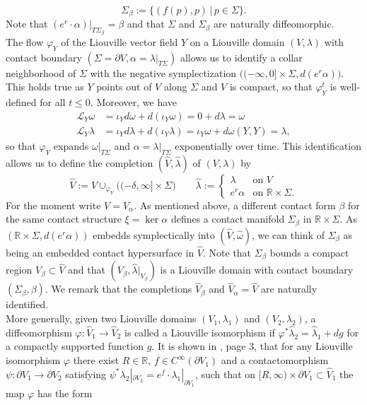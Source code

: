 \documentclass[a4paper,12pt,bibliography=totocnumbered,titlepage=false,abstracton,bookmarksnumbered=true]{scrartcl}
\theoremstyle{definition}
\begin{document}
\[\Sigma_\beta :=\big\{(f(p),p)\,\big|\,p\in\Sigma\big\}.\]
Note that $(e^r{\cdot}\alpha)|_{T\Sigma_\beta}=\beta$ and that $\Sigma$ and $\Sigma_\beta$ are naturally diffeomorphic.\\
The flow $\varphi_Y$ of the Liouville vector field $Y$ on a Liouville domain $(V,\lambda)$ with contact boundary $(\Sigma=\partial V,\alpha=\lambda|_{T\Sigma})$ allows us to identify a collar neighborhood of $\Sigma$ with the negative symplectization $\big((-\infty,0]{\times}\Sigma, d(e^r\alpha)\big)$. This holds true as $Y$ points out of $V$ along $\Sigma$ and $V$ is compact, so that $\varphi_Y^t$ is well-defined for all $t\leq 0$. Moreover, we have
\begin{align*}
 \mathcal{L}_Y \omega &=\iota_Y d\omega + d(\iota_Y\omega)=0+d\lambda=\omega\\
 \mathcal{L}_Y \lambda &=\iota_Y d\lambda + d(\iota_Y\lambda)=\iota_Y\omega+d\omega(Y,Y)=\lambda,
\end{align*}
so that $\varphi_Y$ expands $\omega|_{T\Sigma}$ and $\alpha=\lambda|_{T\Sigma}$ exponentially over time. This identification allows us to define the completion $(\widehat{V},\widehat{\lambda})$ of $(V,\lambda)$ by
\[\widehat{V}:=V\cup_{\varphi_Y}\big((-\delta,\infty]{\times}\Sigma\big)\qquad\widehat{\lambda}:=\begin{cases}\lambda &\text{on $V$}\\e^r\alpha & \text{on $\mathbb{R}{\times}\Sigma$.}\end{cases}\]
For the moment write $V=V_\alpha$. As mentioned above, a different contact form $\beta$ for the same contact structure $\xi=\ker \alpha$ defines a contact manifold $\Sigma_\beta$ in $\mathbb{R}{\times}\Sigma$. As $(\mathbb{R}{\times}\Sigma,d(e^r\alpha))$ embedds symplectically into $(\widehat{V},\widehat{\omega})$, we can think of $\Sigma_\beta$ as being an embedded contact hypersurface in $\widehat{V}$. Note that $\Sigma_\beta$ bounds a compact region $V_\beta\subset\widehat{V}$ and that $(V_\beta,\widehat{\lambda}|_{V_\beta})$ is a Liouville domain with contact boundary $(\Sigma_\beta,\beta)$. We remark that the completions $\widehat{V}_\beta$ and $\widehat{V}_\alpha=\widehat{V}$ are naturally identified.\\
More generally, given two Liouville domains $(V_1,\lambda_1)$ and $(V_2,\lambda_2)$, a diffeomorphism  $\varphi : \widehat{V}_1\rightarrow \widehat{V}_2$ is called a Liouville isomorphism if $\varphi^\ast\widehat{\lambda}_2=\widehat{\lambda}_1+dg$ for a compactly supported function $g$. It is shown in \cite{Sei}, page 3, that for any Liouville isomorphism $\varphi$ there exist $R\in\mathbb{R}$, $f\in C^\infty(\partial V_1)$ and a contactomorphism $\psi: \partial V_1\rightarrow \partial V_2$ satisfying $\psi^\ast \lambda_2|_{\partial V_2}=e^f{\cdot} \lambda_1|_{\partial V_1}$, such that on $[R,\infty){\times} \partial V_1\subset \widehat{V}_1$ the map $\varphi$ has the form
\end{document}
